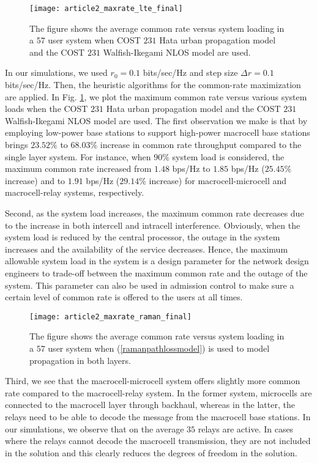 \documentclass[conference,letterpaper,final,10pt]{IEEEtran}
\begin{document}
\begin{figure}[tb!]\begin{center}
  \texttt{[image: article2\_maxrate\_lte\_final]}\caption{The figure shows the average common rate versus system loading in a $57$ user system when COST $231$ Hata urban propagation model and the COST $231$ Walfish-Ikegami NLOS model are used.}\label{lterate}\end{center}
\end{figure}

In our simulations, we used $r_0 = 0.1$ bits/sec/Hz and step size $\Delta r = 0.1$ bits/sec/Hz. Then, the heuristic algorithms for the common-rate maximization are applied. In Fig. \ref{lterate}, we plot the maximum common rate versus various system loads when the COST $231$ Hata urban propagation model and the COST $231$ Walfish-Ikegami NLOS model are used. The first observation we make is that by employing low-power base stations to support high-power macrocell base stations brings $23.52\%$ to $68.03\%$ increase in common rate throughput compared to the single layer system. For instance, when $90\%$ system load is considered, the maximum common rate increased from $1.48$ bps/Hz to $1.85$ bps/Hz ($25.45\%$ increase) and to $1.91$ bps/Hz ($29.14\%$ increase) for macrocell-microcell and macrocell-relay systems, respectively.


Second, as the system load increases, the maximum common rate decreases due to the increase in both intercell and intracell interference. Obviously, when the system load is reduced by the central processor, the outage in the system increases and the availability of the service decreases. Hence, the maximum allowable system load in the system is a design parameter for the network design engineers to trade-off between the maximum common rate and the outage of the system. This parameter can also be used in admission control to make sure a certain level of common rate is offered to the users at all times.

\begin{figure}[tb!]\begin{center}
  \texttt{[image: article2\_maxrate\_raman\_final]}\caption{The figure shows the average common rate versus system loading in a $57$ user system when (\ref{ramanpathlossmodel}) is used to model propagation in both layers.}\label{ramanrate}\end{center}
\end{figure}

Third, we see that the macrocell-microcell system offers slightly more common rate compared to the macrocell-relay system. In the former system, microcells are connected to the macrocell layer through backhaul, whereas in the latter, the relays need to be able to decode the message from the macrocell base stations. In our simulations, we observe that on the average $35$ relays are active. In cases where the relays cannot decode the macrocell transmission, they are not included in the solution and this clearly reduces the degrees of freedom in the solution.
\end{document}
